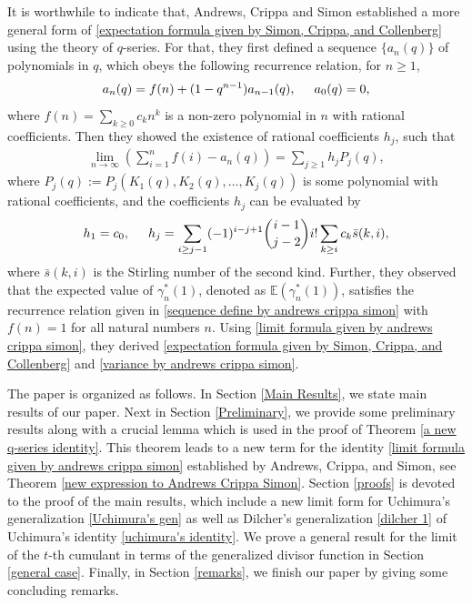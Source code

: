 \documentclass[11pt,reqno]{amsart}
\renewcommand{\(}{\left\(}
\renewcommand{\)}{\right\)}
\renewcommand{\[}{\left\[}
\renewcommand{\]}{\right\]}
\numberwithin{equation}{section}
\theoremstyle{plain}
\begin{document}

It is worthwhile to indicate that,  Andrews, Crippa and Simon \cite{andrewssiam1997} established a more general form of \eqref{expectation formula given by Simon, Crippa, and Collenberg} using the theory of $q$-series.   For that, they first defined a sequence $\{a_n(q)\}$ of polynomials in $q$, which obeys the following recurrence relation, for $n\geq 1$, 
\begin{align}\label{sequence define by andrews crippa simon}
a_n(q)=f(n)+(1-q^{n-1})a_{n-1}(q),\hspace{5mm}a_0(q)=0,
\end{align}
where $f(n)=\sum_{k\geq 0}c_kn^k$ is a non-zero polynomial in $n$ with rational coefficients. Then they showed the existence of rational coefficients $h_j$,  such that
\begin{align}\label{limit formula given by andrews crippa simon}
\lim_{n\rightarrow \infty} \left( \sum_{i=1}^n f(i)-a_n(q) \right) = \sum_{j\geq 1} h_jP_j(q),
\end{align}
where $P_j(q):=P_j(K_1(q),  K_2(q),\dots,K_{j}(q))$ is some polynomial with rational coefficients,
and the coefficients $h_j$ can be evaluated by 
\begin{align*}
h_1=c_0,\hspace{5mm} h_j=\sum_{i\geq j-1}(-1)^{i-j+1} {i-1 \choose j-2} i! \sum_{k\geq i}c_k \bar{s}(k,i),
\end{align*}
where $\bar{s}(k,i)$ is the Stirling number of the second kind. Further, they observed that the expected value of $\gamma^*_n(1)$, denoted as $\mathbb{E}(\gamma^*_n(1))$, satisfies the recurrence relation given in \eqref{sequence define by andrews crippa simon} with $f(n) = 1$ for all natural numbers $n$. Using \eqref{limit formula given by andrews crippa simon}, they derived \eqref{expectation formula given by Simon, Crippa, and Collenberg} and \eqref{variance by andrews crippa simon}.


The paper is organized as follows.  In Section \ref{Main Results},  we state main results of our paper.  
Next in Section \ref{Preliminary},  we provide some preliminary results along with a crucial lemma which is used in the proof of Theorem \ref{a new q-series identity}.  This theorem leads to a new term for the identity \eqref{limit formula given by andrews crippa simon} established by Andrews, Crippa, and Simon,  see Theorem \ref{new expression to Andrews Crippa Simon}.  Section \ref{proofs} is devoted to the proof of the main results,  which include a new limit form for Uchimura's generalization \eqref{Uchimura's gen} as well as Dilcher's generalization \eqref{dilcher 1} of Uchimura's identity \eqref{uchimura's identity}.    
We prove a general result for the limit of the $t$-th cumulant in terms of the generalized divisor function in Section \ref{general case}. 
Finally,  in Section \ref{remarks},  we finish our paper by giving some concluding remarks.  
\end{document}
